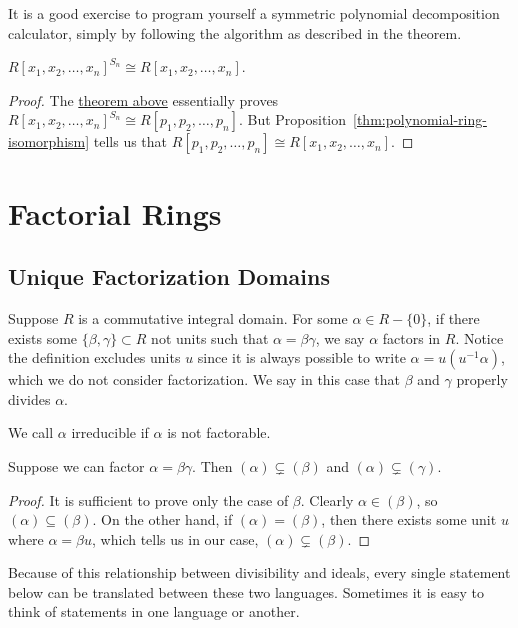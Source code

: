\begin{remark}
    It is a good exercise to program yourself
    a symmetric polynomial decomposition calculator,
    simply by following the algorithm as described in the theorem.
\end{remark}
\begin{corollary}
    \({R[x_1,x_2,\hdots,x_n]}^{S_n} \cong R[x_1,x_2,\hdots,x_n]\).
\end{corollary}
\begin{proof}
    The \hyperref[thm:fundamental-sym-polynomial]{theorem above}
    essentially proves \({R[x_1,x_2,\hdots,x_n]}^{S_n} \cong R[p_1,p_2,\hdots,p_n]\).
    But Proposition~\ref{thm:polynomial-ring-isomorphism}
    tells us that \(R[p_1,p_2,\hdots,p_n] \cong R[x_1,x_2,\hdots,x_n]\).
\end{proof}


\section{Factorial Rings}\label{sec:factorial-rings}

\subsection*{Unique Factorization Domains}

\begin{definition}
    Suppose \(R\) is a commutative integral domain.
    For some \(\alpha \in R - \{0\}\),
    if there exists some \(\{\beta,\gamma\} \subset R\) not units
    such that \(\alpha = \beta\gamma\),
    we say \(\alpha\) factors in \(R\).
    Notice the definition excludes units \(u\)
    since it is always possible to write \(\alpha = u(u^{-1}\alpha)\),
    which we do not consider factorization.
    We say in this case that \(\beta\) and \(\gamma\) properly divides \(\alpha\).
\end{definition}
\begin{definition}
    We call \(\alpha\) irreducible if \(\alpha\) is not factorable.
\end{definition}
\begin{proposition}
    Suppose we can factor \(\alpha = \beta\gamma\).
    Then \((\alpha) \subsetneq (\beta)\) and \((\alpha) \subsetneq (\gamma)\).
\end{proposition}
\begin{proof}
    It is sufficient to prove only the case of \(\beta\).
    Clearly \(\alpha \in (\beta)\), so \((\alpha) \subseteq (\beta)\).
    On the other hand, if \((\alpha) = (\beta)\),
    then there exists some unit \(u\) where \(\alpha = \beta u\),
    which tells us in our case, \((\alpha) \subsetneq (\beta)\).
\end{proof}
\begin{remark}
    Because of this relationship between divisibility and ideals,
    every single statement below
    can be translated between these two languages.
    Sometimes it is easy to think of statements in one language or another.
\end{remark}

